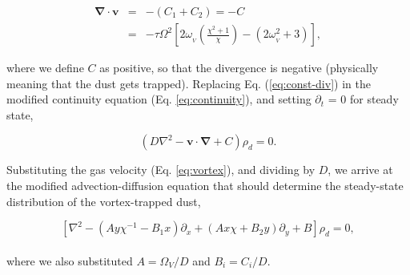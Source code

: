 \documentclass[apj]{emulateapj}
\renewcommand{\v}[1]{{\boldsymbol{#1}}} %
\newcommand{\del}{\v{\nabla}}
\newcommand{\Div}{\del\cdot}
\newcommand{\Laplace}{\nabla^2}
\newcommand{\Eq}[1]{Eq. (\ref{#1})}
\newcommand{\eq}[1]{\Eq{#1}}
\newcommand{\eqp}[1]{(Eq. \ref{#1})}
\newcommand{\beq}{\begin{equation}}
\newcommand{\eeq}{\end{equation}}
\newcommand{\beqn}{\begin{eqnarray}}
\newcommand{\eeqn}{\end{eqnarray}}
\begin{document}
\beqn
\Div{\v{v}} &=& -(C_1+C_2) = - C \label{eq:const-div}\\
&=& - \tau\varOmega^2
\left[2\omega_{_V}\left(\frac{\chi^2+1}{\chi}\right) - (2\omega_{_V}^2
  + 3) \right], 
\label{eq:scale-div}
\eeqn

\noindent where we define $C$ as positive, so that the divergence is
negative (physically meaning that the dust gets trapped). Replacing
\eq{eq:const-div} in the modified continuity equation \eqp{eq:continuity}, and setting $\partial_t$ =
0 for steady state, 

\beq
\left(D\Laplace{} -  \v{v}\cdot\del  + C\right)\rho_d = 0. 
\label{eq:steady}
\eeq

Substituting the gas velocity \eqp{eq:vortex}, and dividing by $D$, we
arrive at the modified advection-diffusion equation that should
determine the steady-state distribution of the vortex-trapped dust, 

\beq
\left[\Laplace{} - \left(Ay\chi^{-1} - B_1x\right) \partial_x  +
  \left(A x \chi + B_2y\right) \partial_y + B \right] \rho_d   = 0,  
\label{eq:dust-trapping-cartesian}
\eeq
\\
\noindent where we also substituted  $A=\varOmega_V/D$ and $B_i=C_i/D$.
\end{document}
